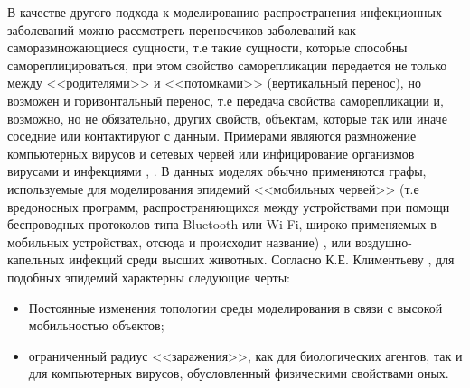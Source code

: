 	В качестве другого подхода к моделированию распространения инфекционных заболеваний можно рассмотреть переносчиков заболеваний как  саморазмножающиеся сущности, т.е такие сущности, которые способны самореплицироваться, при этом свойство  саморепликации передается не только между <<родителями>> и <<потомками>> (вертикальный перенос), но возможен и горизонтальный перенос, т.е передача свойства саморепликации и, возможно, но не обязательно, других свойств, объектам, которые так или иначе соседние или контактируют с данным.  Примерами являются размножение компьютерных вирусов и сетевых червей  %
	\cite{Bratus:2010}
 или инфицирование организмов вирусами и инфекциями %
 \cite{Klimentiev:2013}, \cite[с. 133]{Smith:Zombies}
. 
В данных моделях обычно применяются графы, используемые для моделирования эпидемий <<мобильных червей>> (т.е вредоносных программ, распространяющихся между устройствами при помощи беспроводных протоколов типа Bluetooth или Wi-Fi, широко применяемых в мобильных устройствах, отсюда и происходит название) %
\cite{Klimentiev:2016}, \cite[с. 27]{Klimentiev:2013}
или воздушно-капельных инфекций среди высших  животных.   %
Согласно К.Е. Климентьеву %
\cite{Klimentiev:2015}, для подобных эпидемий характерны следующие черты:
\begin{itemize}
	\item Постоянные изменения топологии среды моделирования в связи с высокой мобильностью  объектов;
	\item ограниченный радиус <<заражения>>, как для биологических агентов, так и для компьютерных вирусов, обусловленный физическими свойствами оных.
\end{itemize}


